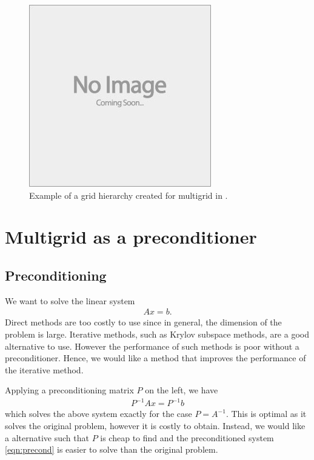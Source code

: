 \begin{figure}
	\includegraphics[draft]{images/placeholder}
	\caption{Example of a grid hierarchy created for multigrid in \oomph.}
\end{figure}






\section{Multigrid as a preconditioner}

\subsection{Preconditioning}
We want to solve the linear system
\begin{align}
	A x = b.
\end{align}
Direct methods are too costly to use since in general, the dimension of the problem is large.
Iterative methods, such as Krylov subspace methods, are a good alternative to use.
However the performance of such methods is poor without a preconditioner.
Hence, we would like a method that improves the performance of the iterative method.


Applying a preconditioning matrix $P$ on the left, we have
\begin{align}
	P^{-1} A x = P^{-1} b \label{eqn:precond}
\end{align}
which solves the above system exactly for the case $P=A^{-1}$. 
This is optimal as it solves the original problem, however it is costly to obtain.
Instead, we would like a alternative such that $P$ is cheap to find and the preconditioned system \eqref{eqn:precond} is easier to solve than the original problem.


